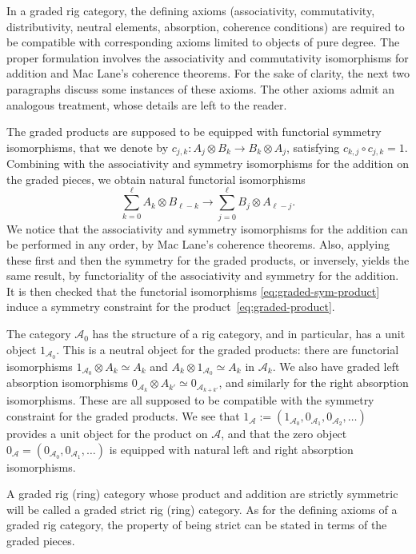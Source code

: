 \documentclass[JEP,XML,SOM,Unicode,published]{cedram}
\theoremstyle{plain}
\theoremstyle{definition}
\newcommand{\Acal}{\mathcal A}
\begin{document}
In a graded rig category, the defining axioms (associativity, commutativity, distributivity, neutral elements, absorption, coherence conditions) are required to be compatible with corresponding axioms limited to objects of pure degree. The proper formulation involves the associativity and commutativity isomorphisms for addition and Mac Lane's coherence theorems. For the sake of clarity, the next two paragraphs discuss some instances of these axioms. The other axioms admit an analogous treatment, whose details are left to the reader.

The graded products are supposed to be equipped with functorial symmetry isomorphisms, that we denote by $c_{j,k}\colon A_{j}\otimes B_{k}\to B_{k}\otimes A_{j}$, satisfying $c_{k,j}\circ c_{j,k}=1$. Combining with the associativity and symmetry isomorphisms for the addition on the graded pieces, we obtain natural functorial isomorphisms
\begin{equation}\label{eq:graded-sym-product}
\sum_{k=0}^{\ell}A_{k}\otimes B_{\ell-k}\to\sum_{j=0}^{\ell}B_{j}\otimes A_{\ell-j}.
\end{equation}
We notice that the associativity and symmetry isomorphisms for the addition can be performed in any order, by Mac Lane's coherence theorems. Also, applying these first and then the symmetry for the graded products, or inversely, yields the same result, by functoriality of the associativity and symmetry for the addition. It is then checked that the functorial isomorphisms \eqref{eq:graded-sym-product} induce a symmetry constraint for the product~\eqref{eq:graded-product}.

The category $\Acal_{0}$ has the structure of a rig category, and in particular, has a unit object $1_{\Acal_{0}}$. This is a neutral object for the graded products: there are functorial isomorphisms $1_{\Acal_{0}}\otimes A_{k}\simeq A_{k}$ and $A_{k}\otimes 1_{\Acal_{0}}\simeq A_{k}$ in $\Acal_{k}$. We also have graded left absorption isomorphisms $0_{\Acal_{k}}\otimes A_{k'}\simeq 0_{\Acal_{k+k'}}$, and similarly for the right absorption isomorphisms. These are all supposed to be compatible with the symmetry constraint for the graded products. We see that $1_{\Acal}:=(1_{\Acal_{0}},0_{\Acal_{1}},0_{\Acal_{2}},\ldots )$ provides a unit object for the product on $\Acal$, and that the zero object $0_{\Acal}=(0_{\Acal_{0}},0_{\Acal_{1}},\ldots)$ is equipped with natural left and right absorption isomorphisms.

A graded rig (\resp ring) category whose product and addition are strictly symmetric will be called a graded strict rig (\resp ring) category. As for the defining axioms of a graded rig category, the property of being strict can be stated in terms of the graded pieces.
\end{document}
